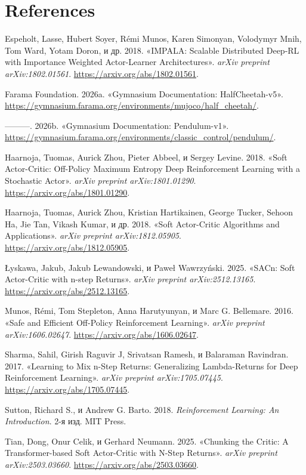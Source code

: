 \documentclass[
  russian,
]{article}
\newlength{\cslhangindent}
\newenvironment{CSLReferences}[2] %
 {\begin{list}{}{%
  \setlength{\itemindent}{0pt}
  \setlength{\leftmargin}{0pt}
  \setlength{\parsep}{0pt}
  \ifodd #1
   \setlength{\leftmargin}{\cslhangindent}
   \setlength{\itemindent}{-1\cslhangindent}
  \fi
  \setlength{\itemsep}{#2\baselineskip}}}
 {\end{list}}
\begin{document}
\section*{References}\label{references}

\protect{}\label{refs}
\begin{CSLReferences}{1}{0}
Espeholt, Lasse, Hubert Soyer, Rémi Munos, Karen Simonyan, Volodymyr
Mnih, Tom Ward, Yotam Doron, и др. 2018. {«IMPALA: Scalable Distributed
Deep-RL with Importance Weighted Actor-Learner Architectures»}.
\emph{arXiv preprint arXiv:1802.01561}.
\url{https://arxiv.org/abs/1802.01561}.

Farama Foundation. 2026a. {«Gymnasium Documentation: HalfCheetah-v5»}.
\url{https://gymnasium.farama.org/environments/mujoco/half_cheetah/}.

---------. 2026b. {«Gymnasium Documentation: Pendulum-v1»}.
\url{https://gymnasium.farama.org/environments/classic_control/pendulum/}.

Haarnoja, Tuomas, Aurick Zhou, Pieter Abbeel, и Sergey Levine. 2018.
{«Soft Actor-Critic: Off-Policy Maximum Entropy Deep Reinforcement
Learning with a Stochastic Actor»}. \emph{arXiv preprint
arXiv:1801.01290}. \url{https://arxiv.org/abs/1801.01290}.

Haarnoja, Tuomas, Aurick Zhou, Kristian Hartikainen, George Tucker,
Sehoon Ha, Jie Tan, Vikash Kumar, и др. 2018. {«Soft Actor-Critic
Algorithms and Applications»}. \emph{arXiv preprint arXiv:1812.05905}.
\url{https://arxiv.org/abs/1812.05905}.

Łyskawa, Jakub, Jakub Lewandowski, и Paweł Wawrzyński. 2025. {«SACn:
Soft Actor-Critic with n-step Returns»}. \emph{arXiv preprint
arXiv:2512.13165}. \url{https://arxiv.org/abs/2512.13165}.

Munos, Rémi, Tom Stepleton, Anna Harutyunyan, и Marc G. Bellemare. 2016.
{«Safe and Efficient Off-Policy Reinforcement Learning»}. \emph{arXiv
preprint arXiv:1606.02647}. \url{https://arxiv.org/abs/1606.02647}.

Sharma, Sahil, Girish Raguvir J, Srivatsan Ramesh, и Balaraman
Ravindran. 2017. {«Learning to Mix n-Step Returns: Generalizing
Lambda-Returns for Deep Reinforcement Learning»}. \emph{arXiv preprint
arXiv:1705.07445}. \url{https://arxiv.org/abs/1705.07445}.

Sutton, Richard S., и Andrew G. Barto. 2018. \emph{Reinforcement
Learning: An Introduction}. 2-я изд. MIT Press.

Tian, Dong, Onur Celik, и Gerhard Neumann. 2025. {«Chunking the Critic:
A Transformer-based Soft Actor-Critic with N-Step Returns»}. \emph{arXiv
preprint arXiv:2503.03660}. \url{https://arxiv.org/abs/2503.03660}.

\end{CSLReferences}
\end{document}
